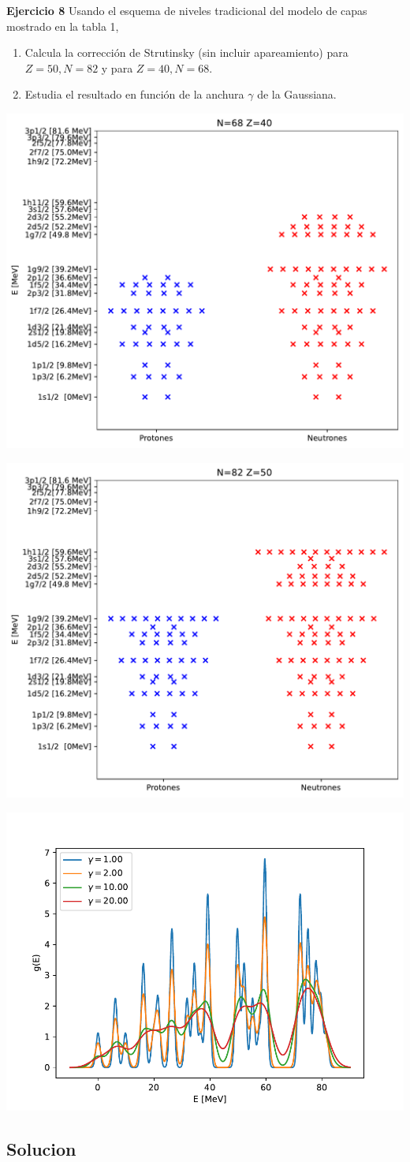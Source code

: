 \begin{texercise}
    \textbf{Ejercicio 8}
    Usando el esquema de niveles tradicional del modelo de capas mostrado en la tabla 1,
    \begin{enumerate}
        \item Calcula la corrección de Strutinsky (sin incluir apareamiento) para $Z=50, N=82$ y para $Z=40, N=68$.
        \item Estudia el resultado en función de la anchura $\gamma$ de la Gaussiana.
    \end{enumerate}
\tcblower
    \begin{center}
        \includegraphics[width=0.6\linewidth]{Cuerpo/Boletin_01/N68_Z40_Bandas.pdf}
    \end{center}
    \begin{center}
        \includegraphics[width=0.6\linewidth]{Cuerpo/Boletin_01/N82_Z50_Bandas.pdf}
    \end{center}
    \begin{center}
        \includegraphics[width=0.6\linewidth]{Cuerpo/Boletin_01/ge.pdf}
    \end{center}
\end{texercise}


\tcbstoprecording


\subsection{Solucion}
\tcbinputrecords